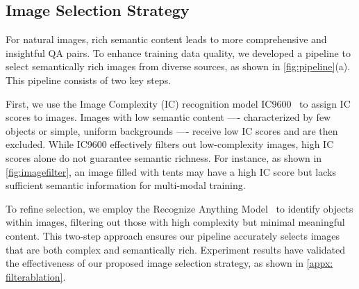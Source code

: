 \subsection{Image Selection Strategy}
\label{sec: filter}

For natural images, rich semantic content leads to more comprehensive and insightful QA pairs. 
To enhance training data quality, 
we developed a pipeline to select semantically rich images from diverse sources, 
as shown in \cref{fig:pipeline}(a). This pipeline consists of two key steps.

First, we use the Image Complexity (IC) recognition model IC9600~\cite{feng2022ic9600} to assign IC scores to images. 
Images with low semantic content —- 
characterized by few objects or simple, uniform backgrounds —- 
receive low IC scores and are then excluded. 
While IC9600 effectively filters out low-complexity images, high IC scores alone do not guarantee semantic richness. 
For instance, as shown in \cref{fig:imagefilter}, an image filled with tents may have a high IC score but lacks sufficient semantic information for multi-modal training.

To refine selection, we employ the Recognize Anything Model~\cite{zhang2024recognize} to identify objects within images, filtering out those with high complexity but minimal meaningful content. This two-step approach ensures our pipeline accurately selects images that are both complex and semantically rich. 
Experiment results have validated the effectiveness of our proposed image selection strategy, as shown in \cref{appx: filterablation}.




